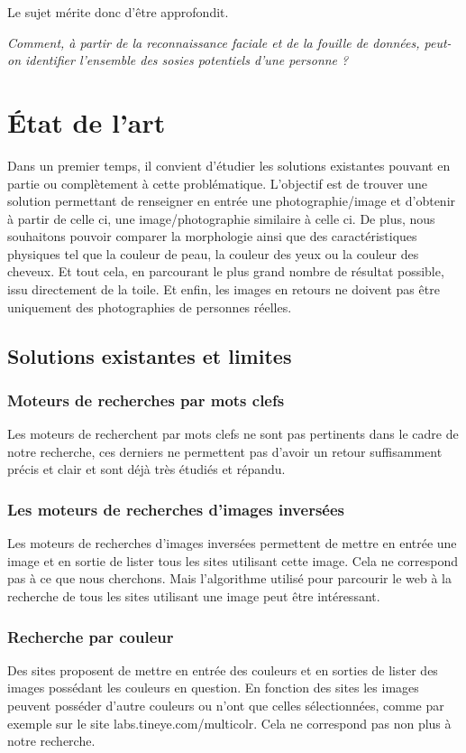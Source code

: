 \documentclass[a4paper,12pt]{article}
\begin{document}
Le sujet mérite donc d'être approfondit. 

\textit{Comment, à partir de la reconnaissance faciale et de la fouille de données, peut-on identifier l'ensemble des sosies potentiels d'une personne ? }
\section{État de l'art}
Dans un premier temps, il convient d'étudier les solutions existantes pouvant en partie ou complètement à cette problématique. 
L'objectif est de trouver une solution permettant de renseigner en entrée une photographie/image et d'obtenir à partir de celle ci, une image/photographie similaire à celle ci. De plus, nous souhaitons pouvoir comparer la morphologie ainsi que des caractéristiques physiques tel que la couleur de peau, la couleur des yeux ou la couleur des cheveux. Et tout cela, en parcourant le plus grand nombre de résultat possible, issu directement de la toile. Et enfin, les images en retours ne doivent pas être uniquement des photographies de personnes réelles.

\subsection{Solutions existantes et limites}
\subsubsection{Moteurs de recherches par mots clefs}
Les moteurs de recherchent par mots clefs ne sont pas pertinents dans le cadre de notre recherche, ces derniers ne permettent pas d'avoir un retour suffisamment précis et clair et sont déjà très étudiés et répandu. 
\subsubsection{Les moteurs de recherches d'images inversées}
Les moteurs de recherches d'images inversées permettent de mettre en entrée une image et en sortie de lister tous les sites utilisant cette image. Cela ne correspond pas à ce que nous cherchons. Mais l'algorithme utilisé pour parcourir le web à la recherche de tous les sites utilisant une image peut être intéressant. 
\subsubsection{Recherche par couleur}
Des sites proposent de mettre en entrée des couleurs et en sorties de lister des images possédant les couleurs en question. En fonction des sites les images peuvent posséder d'autre couleurs ou n'ont que celles sélectionnées, comme par exemple sur le site labs.tineye.com/multicolr. Cela ne correspond pas non plus à notre recherche. 
\end{document}
